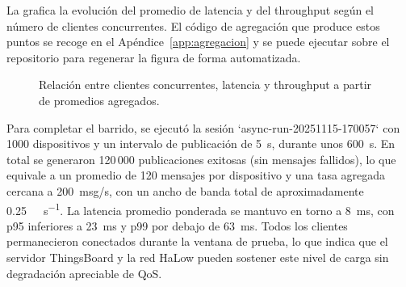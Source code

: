 ﻿\documentclass[conference]{IEEEtran}
\begin{document}
La  grafica la evoluci\'on del promedio de latencia y del throughput seg\'un el n\'umero de clientes concurrentes. El c\'odigo de agregaci\'on que produce estos puntos se recoge en el Ap\'endice~\ref{app:agregacion} y se puede ejecutar sobre el repositorio para regenerar la figura de forma automatizada.

\begin{figure}[!t]
\centering
{}
\caption{Relaci\'on entre clientes concurrentes, latencia y throughput a partir de promedios agregados.}
\label{fig:latencia-promedio}
\end{figure}

Para completar el barrido, se ejecut\'o la sesi\'on `async-run-20251115-170057` con \num{1000} dispositivos y un intervalo de publicaci\'on de \SI{5}{\second}, durante unos \SI{600}{\second}. En total se generaron 120\,000 publicaciones exitosas (sin mensajes fallidos), lo que equivale a un promedio de \num{120} mensajes por dispositivo y una tasa agregada cercana a \num{200}~msg/s, con un ancho de banda total de aproximadamente \SI{0.25}{\mega\bit\per\second}. La latencia promedio ponderada se mantuvo en torno a \SI{8}{\milli\second}, con p95 inferiores a \SI{23}{\milli\second} y p99 por debajo de \SI{63}{\milli\second}. Todos los clientes permanecieron conectados durante la ventana de prueba, lo que indica que el servidor ThingsBoard y la red HaLow pueden sostener este nivel de carga sin degradaci\'on apreciable de QoS.
\end{document}
